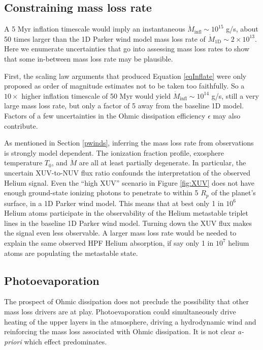 \documentclass[twocolumn]{aastex631}
\begin{document}
\subsection{Constraining mass loss rate}
A 5 Myr inflation timescale would imply an instantaneous $\dot{M}_\mathrm{infl}\sim10^{15}$ g/s, about 50 times larger than the 1D Parker wind model mass loss rate of $\dot{M}_\mathrm{1D}\sim2\times10^{13}$. Here we enumerate uncertainties that go into assessing mass loss rates to show that some in-between mass loss rate may be plausible.

First, the scaling law arguments that produced Equation \ref{eqInflate} were only proposed as order of magnitude estimates not to be taken too faithfully.  So a $10\times$ higher inflation timescale of 50 Myr would yield $\dot{M}_\mathrm{infl}\sim10^{14}$ g/s, still a very large mass loss rate, but only a factor of 5 away from the baseline 1D model.  Factors of a few uncertainties in the Ohmic dissipation efficiency $\epsilon$ may also contribute.

As mentioned in Section \ref{pwinds}, inferring the mass loss rate from observations is strongly model dependent.  The ionization fraction profile, exosphere temperature $T_0$, and $\dot{M}$ are all at least partially degenerate.  In particular, the uncertain XUV-to-NUV flux ratio confounds the interpretation of the observed Helium signal.  Even the ``high XUV'' scenario in Figure \ref{fig:XUV} does not have enough ground-state ionizing photons to penetrate to within 5 $R_p$ of the planet's surface, in a 1D Parker wind model.  This means that at best only 1 in $10^{6}$ Helium atoms participate in the observability of the Helium metastable triplet lines in the baseline 1D Parker wind model.  Turning down the XUV flux makes the signal even less observable.  A larger mass loss rate would be needed to explain the same observed HPF Helium absorption, if say only 1 in $10^{7}$ helium atoms are populating the metastable state.

\subsection{Photoevaporation}
The prospect of Ohmic dissipation does not preclude the possibility that other mass loss drivers are at play.  Photoevaporation \citep{2009ApJ...693...23M} could simultaneously drive heating of the upper layers in the atmosphere, driving a hydrodynamic wind and reinforcing the mass loss associated with Ohmic dissipation.  It is not clear \emph{a-priori} which effect predominates.
\end{document}
